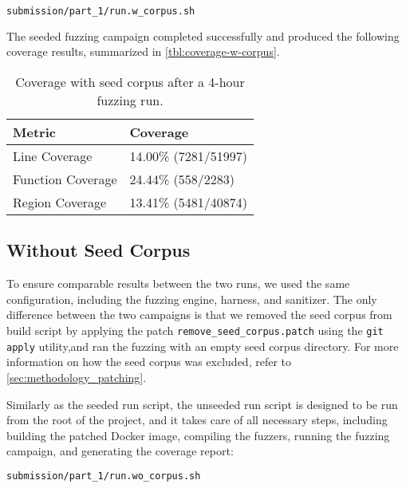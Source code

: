 \documentclass[11pt,a4paper,twocolumn]{article}
\begin{document}
\begin{lstlisting}[language=bash, caption=Bash command to run an automated fuzzing campaign with seed corpus]
submission/part_1/run.w_corpus.sh
\end{lstlisting}

The seeded fuzzing campaign completed successfully and produced the following coverage results, summarized in \autoref{tbl:coverage-w-corpus}.

\begin{table}[ht]
	\centering
	\begin{tabular}{@{}ll@{}}
		\toprule
		\textbf{Metric}   & \textbf{Coverage}    \\
		\midrule
		Line Coverage     & 14.00\% (7281/51997) \\
		Function Coverage & 24.44\% (558/2283)   \\
		Region Coverage   & 13.41\% (5481/40874) \\
		\bottomrule
	\end{tabular}
	\caption{Coverage with seed corpus after a 4-hour fuzzing run.}
	\label{tbl:coverage-w-corpus}
\end{table}

\subsection*{Without Seed Corpus} \label{sec:without-seed}

To ensure comparable results between the two runs, we used the same configuration, including the fuzzing engine, harness, and sanitizer. The only difference between the two campaigns is that we removed the seed corpus from build script by applying the patch \texttt{remove\_seed\_corpus.patch} using the \texttt{git apply} utility,and ran the fuzzing with an empty seed corpus directory. For more information on how the seed corpus was excluded, refer to \autoref{sec:methodology_patching}.

Similarly as the seeded run script, the unseeded run script is designed to be run from the root of the project, and it takes care of all necessary steps, including building the patched Docker image, compiling the fuzzers, running the fuzzing campaign, and generating the coverage report:

\begin{lstlisting}[language=bash, caption=Bash command to run an automated fuzzing campaign without seed corpus]
submission/part_1/run.wo_corpus.sh
\end{lstlisting}
\end{document}
